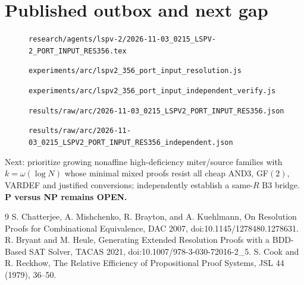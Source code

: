\documentclass[11pt]{article}
\begin{document}
\section*{Published outbox and next gap}
\begin{description}
\item[] \texttt{research/agents/lspv-2/2026-11-03\_0215\_LSPV-2\_PORT\_INPUT\_RES356.tex}
\item[] \texttt{experiments/arc/lspv2\_356\_port\_input\_resolution.js}
\item[] \texttt{experiments/arc/lspv2\_356\_port\_input\_independent\_verify.js}
\item[] \texttt{results/raw/arc/2026-11-03\_0215\_LSPV2\_PORT\_INPUT\_RES356.json}
\item[] \texttt{results/raw/arc/2026-11-03\_0215\_LSPV2\_PORT\_INPUT\_RES356\_independent.json}
\end{description}
\noindent Next: prioritize growing nonaffine high-deficiency miter/source families with $k=\omega(\log N)$ whose minimal mixed proofs resist all cheap AND3, GF$(2)$, VARDEF and justified conversions; independently establish a same-$R$ B3 bridge. \textbf{P versus NP remains OPEN.}
\begin{thebibliography}{9}
 S. Chatterjee, A. Mishchenko, R. Brayton, and A. Kuehlmann, On Resolution Proofs for Combinational Equivalence, DAC 2007, doi:10.1145/1278480.1278631.
 R. Bryant and M. Heule, Generating Extended Resolution Proofs with a BDD-Based SAT Solver, TACAS 2021, doi:10.1007/978-3-030-72016-2\_5.
 S. Cook and R. Reckhow, The Relative Efficiency of Propositional Proof Systems, JSL 44 (1979), 36--50.
\end{thebibliography}
\end{document}
